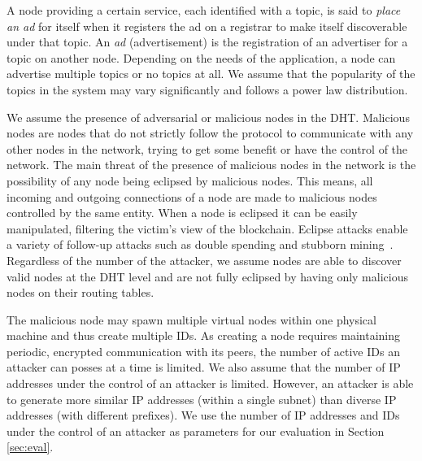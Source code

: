 A node providing a certain service,  each identified with a topic,  is said to \emph{place an ad} for itself when it registers the ad on a registrar to make itself discoverable under that topic. 
An \emph{ad} (\ie advertisement) is the registration of an advertiser for a topic on another node. Depending on the needs of the application, a node can advertise multiple topics or no topics at all. 
We assume that the popularity of the topics in the system may vary significantly and follows a power law distribution. 

We assume the presence of adversarial or malicious nodes in the DHT. 
Malicious nodes are nodes that do not strictly follow the protocol to communicate with any other nodes in the network,  trying to get some benefit or have the control of the network.
The main threat of the presence of malicious nodes in the network is the possibility of any node being eclipsed by malicious nodes.
This means,  all incoming and outgoing connections of a node are made to malicious nodes controlled by the same entity. 
When a node is eclipsed it can be easily manipulated,
filtering the victim’s view of the blockchain.  
Eclipse attacks
enable a variety of follow-up attacks such as double spending
and stubborn mining~\cite{stubborn}.
Regardless of the number of the attacker, we assume nodes are able to discover valid nodes at the DHT level and are not fully eclipsed by having only malicious nodes on their routing tables.
%

The malicious node may spawn multiple virtual nodes within one physical machine and thus create multiple IDs. 
As creating a node requires maintaining periodic, encrypted communication with its peers, the number of active IDs an attacker can posses at a time is limited. 
We also assume that the number of IP addresses under the control of an attacker is limited. 
However, an attacker is able to generate more similar IP addresses (within a single subnet) than diverse IP addresses (with different prefixes). 
We use the number of IP addresses and IDs under the control of an attacker as parameters for our evaluation in Section \ref{sec:eval}.



